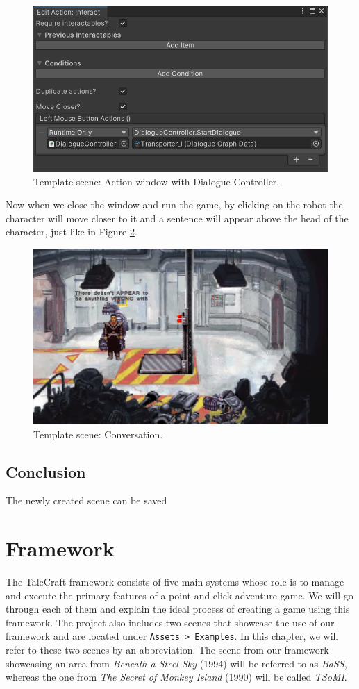 \begin{figure}[H]
\centering
\includegraphics[width=0.75\linewidth]{img/User doc/image_2025-07-09_112421422.png}
\caption{Template scene: Action window with Dialogue Controller.}
\label{fig:Tutorial-template:AW+DC}
\end{figure}

Now when we close the window and run the game, by clicking on the robot the character will move closer to it and a sentence will appear above the head of the character, just like in Figure \ref{fig:Tutorial-template:fin}.

\begin{figure}[H]
\centering
\includegraphics[width=0.85\linewidth]{img/User doc/manual-fin.png}
\caption{Template scene: Conversation.}
\label{fig:Tutorial-template:fin}
\end{figure}

\subsection{Conclusion}
The newly created scene can be saved 


\section{Framework}
The TaleCraft framework consists of five main systems whose role is to manage and execute the primary features of a point-and-click adventure game. We will go through each of them and explain the ideal process of creating a game using this framework. The project also includes two scenes that showcase the use of our framework and are located under \verb|Assets > Examples|. In this chapter, we will refer to these two scenes by an abbreviation. The scene from our framework showcasing an area from \textit{Beneath a Steel Sky} (1994) will be referred to as \textit{BaSS}, whereas the one from \textit{The Secret of Monkey Island} (1990) will be called \textit{TSoMI}.

